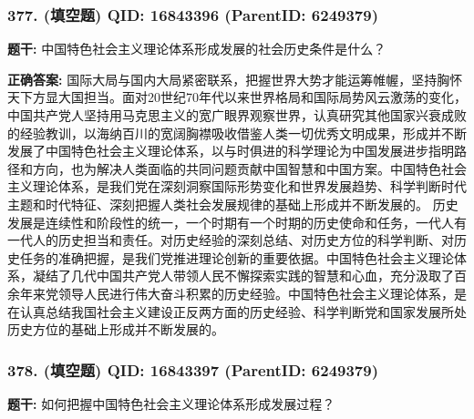 \documentclass[12pt,UTF8]{ctexart}
\begin{document}
\vspace{0.3em}\hrulefill\vspace{0.7em}

\subsubsection*{377. (填空题) \small QID: 16843396 (ParentID: 6249379)}

\textbf{题干:}
中国特色社会主义理论体系形成发展的社会历史条件是什么？



\textbf{正确答案:}
国际大局与国内大局紧密联系，把握世界大势才能运筹帷幄，坚持胸怀天下方显大国担当。面对20世纪70年代以来世界格局和国际局势风云激荡的变化，中国共产党人坚持用马克思主义的宽广眼界观察世界，认真研究其他国家兴衰成败的经验教训，以海纳百川的宽阔胸襟吸收借鉴人类一切优秀文明成果，形成并不断发展了中国特色社会主义理论体系，以与时俱进的科学理论为中国发展进步指明路径和方向，也为解决人类面临的共同问题贡献中国智慧和中国方案。中国特色社会主义理论体系，是我们党在深刻洞察国际形势变化和世界发展趋势、科学判断时代主题和时代特征、深刻把握人类社会发展规律的基础上形成并不断发展的。
历史发展是连续性和阶段性的统一，一个时期有一个时期的历史使命和任务，一代人有一代人的历史担当和责任。对历史经验的深刻总结、对历史方位的科学判断、对历史任务的准确把握，是我们党推进理论创新的重要依据。中国特色社会主义理论体系，凝结了几代中国共产党人带领人民不懈探索实践的智慧和心血，充分汲取了百余年来党领导人民进行伟大奋斗积累的历史经验。中国特色社会主义理论体系，是在认真总结我国社会主义建设正反两方面的历史经验、科学判断党和国家发展所处历史方位的基础上形成并不断发展的。

\vspace{0.3em}\hrulefill\vspace{0.7em}

\subsubsection*{378. (填空题) \small QID: 16843397 (ParentID: 6249379)}

\textbf{题干:}
如何把握中国特色社会主义理论体系形成发展过程？
\end{document}
